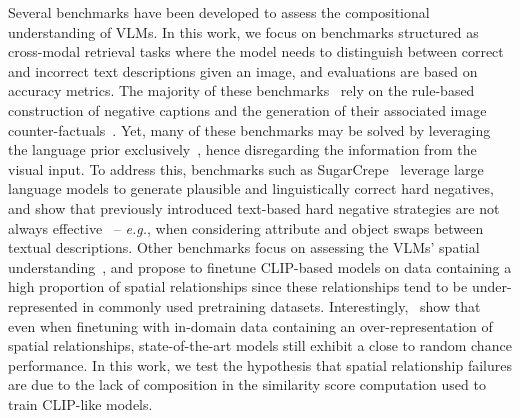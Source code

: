 Several benchmarks have been developed to assess the compositional understanding of VLMs. In this work, we focus on benchmarks structured as cross-modal retrieval tasks where the model needs to distinguish between correct and incorrect text descriptions given an image, and evaluations are based on accuracy metrics. The majority of these benchmarks~\citep{zhao2022vl, yuksekgonul2023visionlanguagemodelsbehavelike, Parcalabescu_2022} rely on the rule-based construction of negative captions and the generation of their associated image counter-factuals~\citep{zhang2024countercurateenhancingphysicalsemantic, awal2024visminvisualminimalchangeunderstanding}. Yet, many of these benchmarks may be solved by leveraging the language prior exclusively~\citep{vqa2, lin2024revisiting}, hence disregarding the information from the visual input. To address this, benchmarks such as SugarCrepe~\citep{hsieh2023sugarcrepe} leverage large language models to generate plausible and linguistically correct hard negatives, and show that previously introduced text-based hard negative strategies are not always effective~\citep{yuksekgonul2023when} -- \textit{e.g.}, when considering attribute and object swaps between textual descriptions.
Other benchmarks focus on assessing the VLMs' spatial understanding~\citep{kamath2023whatsupvisionlanguagemodels, yuksekgonul2023when, zhang2024countercurateenhancingphysicalsemantic}, and propose to finetune CLIP-based models on data containing a high proportion of spatial relationships since these relationships tend to be under-represented in commonly used pretraining datasets. Interestingly,~\citet{kamath2023whatsupvisionlanguagemodels} show that even when finetuning with in-domain data containing an over-representation of spatial relationships, state-of-the-art models still exhibit a close to random chance performance. In this work, we test the hypothesis that spatial relationship failures are due to the lack of composition in the similarity score computation used to train CLIP-like models.


\iffalse
\myparagraph{PUG environment?}

\todo{Difficulty of evaluate the sample-efficiency of the effect hard negatives at scale so we first validate it in a controlled environment where we have access to the entire vocab + existing hard negatives }


Because of the difficulty of getting negative ground truth images, researchers often use synthetic data such like CLEVR~\citep{Johnson2016CLEVRAD} to generate a balanced set of negative images and captions. In this work, we decided to leverage the PUG framework~\citep{bordes2023pugphotorealisticsemanticallycontrollable} to make a synthetic image dataset with realistic 
\fi


